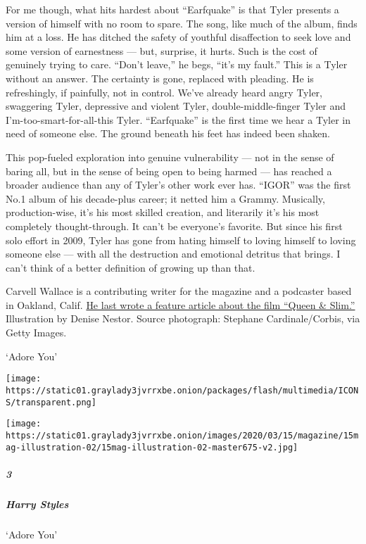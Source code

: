 For me though, what hits hardest about ``Earf­quake'' is that Tyler
presents a version of himself with no room to spare. The song, like much
of the album, finds him at a loss. He has ditched the safety of youthful
disaffection to seek love and some version of earnestness --- but,
surprise, it hurts. Such is the cost of genuinely trying to care.
``Don't leave,'' he begs, ``it's my fault.'' This is a Tyler without an
answer. The certainty is gone, replaced with pleading. He is
refreshingly, if painfully, not in control. We've already heard angry
Tyler, swaggering Tyler, depressive and violent Tyler,
double-middle-finger Tyler and I'm-too-smart-for-all-this Tyler.
``Earf­quake'' is the first time we hear a Tyler in need of someone
else. The ground beneath his feet has indeed been shaken.

This pop-fueled exploration into genuine vulnerability --- not in the
sense of baring all, but in the sense of being open to being harmed ---
has reached a broader audience than any of Tyler's other work ever has.
``IGOR'' was the first No.1 album of his decade-plus career; it netted
him a Grammy. Musically, production-wise, it's his most skilled
creation, and literarily it's his most completely thought-through. It
can't be everyone's favorite. But since his first solo effort in 2009,
Tyler has gone from hating himself to loving himself to loving someone
else --- with all the destruction and emotional detritus that brings. I
can't think of a better definition of growing up than that.

Carvell Wallace is a contributing writer for the magazine and a
podcaster based in Oakland, Calif.
\href{https://www.nytimes3xbfgragh.onion/2019/11/21/magazine/queen-slim-movie.html}{He
last wrote a feature article about the film ``Queen \& Slim.''}
Illustration by Denise Nestor. Source photograph: Stephane
Cardinale/Corbis, via Getty Images.

`Adore You'

\texttt{[image: https://static01.graylady3jvrrxbe.onion/packages/flash/multimedia/ICONS/transparent.png]}

\texttt{[image: https://static01.graylady3jvrrxbe.onion/images/2020/03/15/magazine/15mag-illustration-02/15mag-illustration-02-master675-v2.jpg]}

\hypertarget{3}{%
\subparagraph{3}\label{3}}

\hypertarget{harry-styles}{%
\subparagraph{Harry Styles}\label{harry-styles}}

`Adore You'

